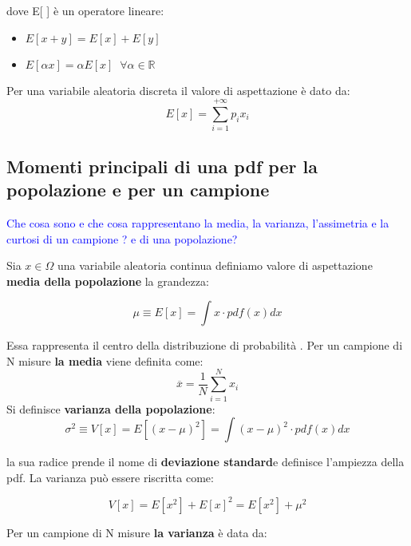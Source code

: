 dove  E[ ] \`{e} un operatore lineare:

\begin{itemize}
	\item $E[x+y] = E[x] + E[y]$
	\item $E[\alpha x] = \alpha E[x] \;\; \forall \alpha \in \mathbb{R}$
\end{itemize}
 Per una variabile aleatoria discreta il valore di aspettazione \`{e} dato da:
 \begin{equation}
 	E[x] = \sum_{i=1}^{+\infty} p_i x_i
 \end{equation}

\subsection{Momenti principali di una pdf per la popolazione e per un campione}

\textcolor{blue}{Che cosa sono e che cosa rappresentano la media, la varianza, l'assimetria e la curtosi di un campione ? e di una popolazione?} \newline

Sia $x \in \Omega $ una variabile aleatoria continua definiamo valore di aspettazione \textbf{media della popolazione} la grandezza:

\begin{equation}
	\mu \equiv E[x] = \int{x \cdot pdf(x)dx}
\end{equation}


\noindent Essa rappresenta il centro della distribuzione di probabilit\`{a} .\newline 
Per un campione di N  misure \textbf{la media} viene definita come: 
\begin{equation}
	\overline{x} = \dfrac{1}{N}\sum_{i=1}^Nx_{i}
\end{equation}
Si definisce \textbf{varianza della popolazione}:
\begin{equation}
	\sigma^2 \equiv V[x] = E[(x-\mu)^2] = \int{(x-\mu)^2 \cdot pdf(x)dx} 	
\end{equation}

la sua radice prende il nome di \textbf{deviazione standard}e definisce l'ampiezza della pdf. La varianza pu\`{o} essere riscritta come:

\begin{equation}
	V[x] = E[x^2] + E[x]^2 = E[x^2] + \mu^2
\end{equation}

Per un campione di N misure \textbf{la varianza} \`{e} data da:

